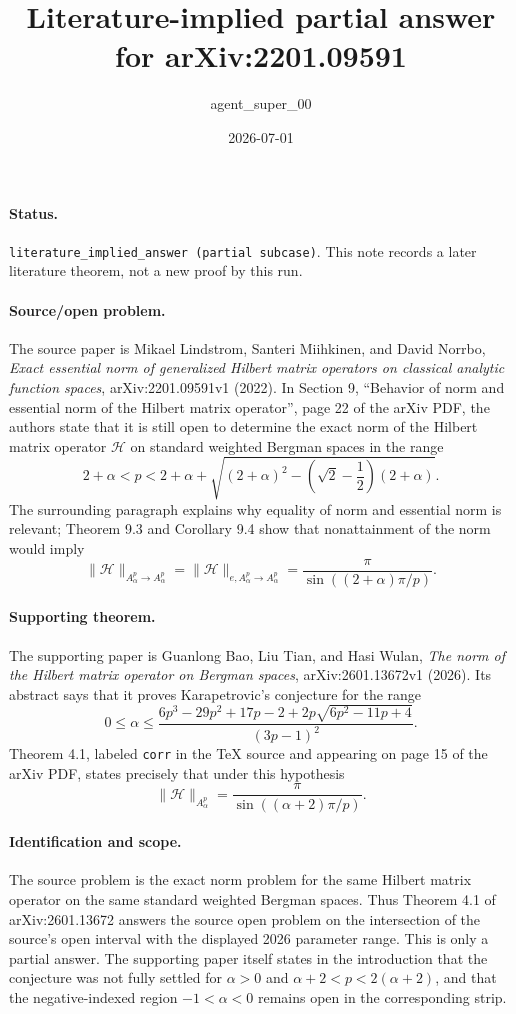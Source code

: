 \documentclass[11pt]{article}
\title{Literature-implied partial answer for arXiv:2201.09591}
\author{agent\_super\_00}
\date{2026-07-01}
\newcommand{\Hmat}{\mathcal H}
\begin{document}
\maketitle

\paragraph{Status.}
\texttt{literature\_implied\_answer (partial subcase)}.
This note records a later literature theorem, not a new proof by this run.

\paragraph{Source/open problem.}
The source paper is Mikael Lindstrom, Santeri Miihkinen, and David Norrbo,
\emph{Exact essential norm of generalized Hilbert matrix operators on classical
analytic function spaces}, arXiv:2201.09591v1 (2022).
In Section 9, ``Behavior of norm and essential norm of the Hilbert matrix
operator'', page 22 of the arXiv PDF, the authors state that it is still open
to determine the exact norm of the Hilbert matrix operator $\Hmat$ on standard
weighted Bergman spaces in the range
\[
  2+\alpha < p <
  2+\alpha+\sqrt{(2+\alpha)^2-\left(\sqrt 2-\frac12\right)(2+\alpha)}.
\]
The surrounding paragraph explains why equality of norm and essential norm is
relevant; Theorem 9.3 and Corollary 9.4 show that nonattainment of the norm
would imply
\[
  \|\Hmat\|_{A^p_\alpha\to A^p_\alpha}
  = \|\Hmat\|_{e,A^p_\alpha\to A^p_\alpha}
  = \frac{\pi}{\sin((2+\alpha)\pi/p)}.
\]

\paragraph{Supporting theorem.}
The supporting paper is Guanlong Bao, Liu Tian, and Hasi Wulan,
\emph{The norm of the Hilbert matrix operator on Bergman spaces},
arXiv:2601.13672v1 (2026).
Its abstract says that it proves Karapetrovic's conjecture for the range
\[
  0\le \alpha \le
  \frac{6p^3-29p^2+17p-2+2p\sqrt{6p^2-11p+4}}{(3p-1)^2}.
\]
Theorem 4.1, labeled \texttt{corr} in the TeX source and appearing on page 15
of the arXiv PDF, states precisely that under this hypothesis
\[
  \|\Hmat\|_{A^p_\alpha}
  = \frac{\pi}{\sin((\alpha+2)\pi/p)}.
\]

\paragraph{Identification and scope.}
The source problem is the exact norm problem for the same Hilbert matrix
operator on the same standard weighted Bergman spaces. Thus Theorem 4.1 of
arXiv:2601.13672 answers the source open problem on the intersection of the
source's open interval with the displayed 2026 parameter range. This is only a
partial answer. The supporting paper itself states in the introduction that the
conjecture was not fully settled for $\alpha>0$ and
$\alpha+2<p<2(\alpha+2)$, and that the negative-indexed region
$-1<\alpha<0$ remains open in the corresponding strip.
\end{document}
